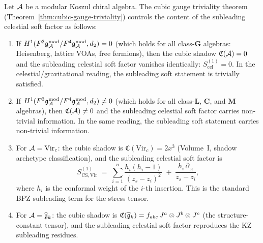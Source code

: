 \begin{theorem}
Let $\mathcal{A}$ be a modular Koszul chiral algebra.
The cubic gauge triviality theorem
(Theorem~\ref{thm:cubic-gauge-triviality}) controls the content
of the subleading celestial soft factor as follows:
\begin{enumerate}[label=\textup{(\roman*)}]
\item If $H^1(F^3\mathfrak{g}_{\mathcal{A}}^{\mathrm{mod}}/F^4\mathfrak{g}_{\mathcal{A}}^{\mathrm{mod}}, d_2) = 0$ (which holds for all
 class-$\mathbf{G}$ algebras: Heisenberg, lattice VOAs, free
 fermions), then the cubic shadow $\mathfrak{C}(\mathcal{A}) = 0$ and
 the subleading celestial soft factor vanishes identically:
 $S^{(1)}_{\mathrm{cel}} = 0$.
 In the celestial/gravitational reading, the subleading soft statement
 is trivially satisfied.
\item If $H^1(F^3\mathfrak{g}_{\mathcal{A}}^{\mathrm{mod}}/F^4\mathfrak{g}_{\mathcal{A}}^{\mathrm{mod}}, d_2) \neq 0$ (which holds
 for all class-$\mathbf{L}$, $\mathbf{C}$, and $\mathbf{M}$
 algebras), then $\mathfrak{C}(\mathcal{A}) \neq 0$ and the subleading
 celestial soft factor carries non-trivial information. In the
 same reading, the subleading soft statement carries non-trivial
 information.
\item For $\mathcal{A} = \mathrm{Vir}_c$: the cubic shadow is
 $\mathfrak{C}(\mathrm{Vir}_c) = 2x^3$
 (Volume~I, shadow archetype classification), and the subleading
 celestial soft factor is
 \begin{equation}%
 S^{(1)}_{\mathrm{CS},\mathrm{Vir}}
 \;=\;
 \sum_{i=1}^{n}
 \frac{h_i(h_i - 1)}{(z_s - z_i)^2}
 \;+\;
 \frac{h_i\,\partial_{z_i}}{z_s - z_i},
 \end{equation}
 where $h_i$ is the conformal weight of the $i$-th insertion.
 This is the standard BPZ subleading term for the stress tensor.
\item For $\mathcal{A} = \widehat{\mathfrak{g}}_k$: the cubic shadow is
 $\mathfrak{C}(\widehat{\mathfrak{g}}_k) = f_{abc}\,J^a \otimes J^b
 \otimes J^c$ (the structure-constant tensor), and the subleading
 celestial soft factor reproduces the KZ subleading residues.
\end{enumerate}
\end{theorem}

